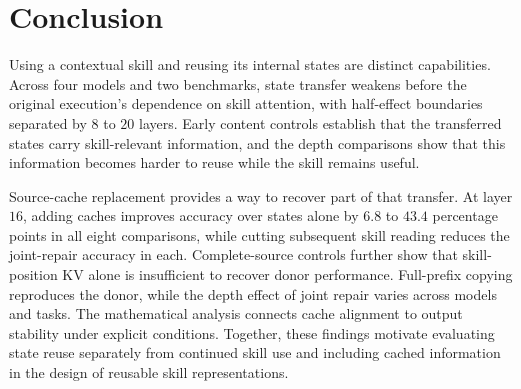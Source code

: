 \section{Conclusion}
\label{sec:conclusion}

Using a contextual skill and reusing its internal states are distinct
capabilities. Across four models and two benchmarks, state transfer
weakens before the original execution's dependence on skill attention,
with half-effect boundaries separated by $8$ to $20$ layers.
Early content controls establish that the transferred states carry
skill-relevant information, and the depth comparisons show that this
information becomes harder to reuse while the skill remains useful.

Source-cache replacement provides a way to recover part of that transfer.
At layer $16$, adding caches improves accuracy over states alone by
$6.8$ to $43.4$ percentage points in all eight comparisons, while cutting
subsequent skill reading reduces the joint-repair accuracy in each.
Complete-source controls further show that skill-position KV alone is
insufficient to recover donor performance. Full-prefix copying reproduces
the donor, while the depth effect of joint repair varies across models
and tasks.
The mathematical analysis connects cache alignment to output stability
under explicit conditions. Together, these findings motivate evaluating
state reuse separately from continued skill use and including cached
information in the design of reusable skill representations.
